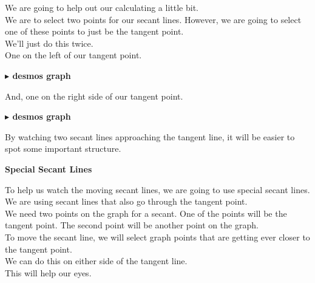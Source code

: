 \documentclass{ximera}
\begin{document}
We are going to help out our calculating a little bit.  \\


We are to select two points for our secant lines.  However, we are going to select one of these points to just be the tangent point. \\ 

We'll just do this twice. \\


One on the left of our tangent point.


\textbf{\textcolor{blue!55!black}{$\blacktriangleright$ desmos graph}} 
\begin{center}
\end{center}




And, one on the right side of our tangent point.


\textbf{\textcolor{blue!55!black}{$\blacktriangleright$ desmos graph}} 
\begin{center}
\end{center}



By watching two secant lines approaching the tangent line, it will be easier to spot some important structure. \\






\begin{idea}   \textbf{\textcolor{blue!55!black}{Special Secant Lines}}


To help us watch the moving secant lines, we are going to use special secant lines. \\

We are using secant lines that also go through the tangent point. \\

We need two points on the graph for a secant. One of the points will be the tangent point.  The second point will be another point on the graph. \\

To move the secant line, we will select graph points that are getting ever closer to the tangent point. \\

We can do this on either side of the tangent line. \\

This will help our eyes.


\end{idea}
\end{document}
